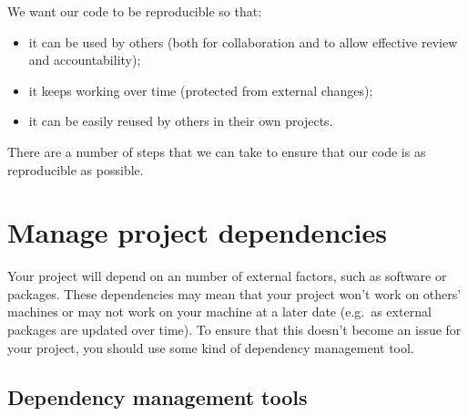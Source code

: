 \documentclass[]{book}
\providecommand{\tightlist}{%
  \setlength{\itemsep}{0pt}\setlength{\parskip}{0pt}}
\begin{document}
We want our code to be reproducible so that:

\begin{itemize}
\tightlist
\item
  it can be used by others (both for collaboration and to allow effective review and accountability);\\
\item
  it keeps working over time (protected from external changes);
\item
  it can be easily reused by others in their own projects.
\end{itemize}

There are a number of steps that we can take to ensure that our code is as reproducible as possible.

\hypertarget{projdep}{%
\section{Manage project dependencies}\label{projdep}}

Your project will depend on an number of external factors, such as software or packages. These dependencies may mean that your project won't work on others' machines or may not work on your machine at a later date (e.g.~as external packages are updated over time). To ensure that this doesn't become an issue for your project, you should use some kind of dependency management tool.

\hypertarget{dependency-management-tools}{%
\subsection*{Dependency management tools}\label{dependency-management-tools}}
\end{document}
